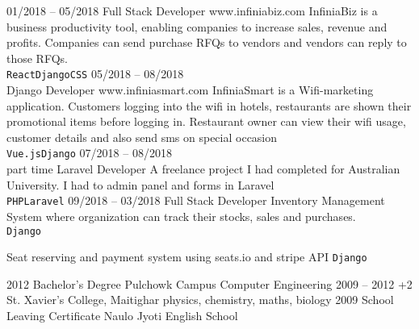 \documentclass[9pt]{developercv} %
\begin{document}
\begin{entrylist}
	\entry
		{01/2018 -- 05/2018}
		{Full Stack Developer}
		{www.infiniabiz.com}
    		{
    InfiniaBiz is a business productivity tool, enabling companies to increase sales, revenue and profits. Companies can send purchase RFQs to vendors and vendors can reply to those RFQs.\\ 
    		    \texttt{React}\slashsep\texttt{Django}\slashsep\texttt{CSS}\slashsep{}}
	\entry
		{05/2018 -- 08/2018\\\footnotesize{}}
		{Django Developer}
		{www.infiniasmart.com}
		{
		    InfiniaSmart is a Wifi-marketing application. Customers logging into the wifi in hotels, restaurants are shown their promotional items before logging in. Restaurant owner can view their wifi usage, customer details and also send sms on special occasion\\
		    \texttt{Vue.js}\slashsep\texttt{Django}
		}
	\entry
		{07/2018 -- 08/2018\\\footnotesize{part time}}
		{Laravel Developer}
		{}
		{
		   A freelance project I had completed for Australian University. I had to admin panel and forms in Laravel\\ \texttt{PHP}\slashsep\texttt{Laravel}
		}
	\entry
	    {09/2018 -- 03/2018}
	    {Full Stack Developer}
	    {}
	    {
	        Inventory Management System where organization can track their stocks, sales and purchases.\\
	        \texttt{Django}\slashsep{}\slashsep{}\slashsep{}
	    }
	    
	    {Seat reserving and payment system using seats.io and stripe API
	        \texttt{Django}\slashsep{}\slashsep{}\slashsep{}
	    }
\end{entrylist}



\begin{entrylist}
	\entry
		{2012}
		{Bachelor's Degree}
		{Pulchowk Campus}
	    {Computer Engineering}
	\entry
		{2009 -- 2012}
		{+2}
		{St. Xavier's College, Maitighar}
		{physics, chemistry, maths, biology}
	\entry
		{2009}
		{School Leaving Certificate}
		{Naulo Jyoti English School}
		{}
\end{entrylist}
\end{document}
